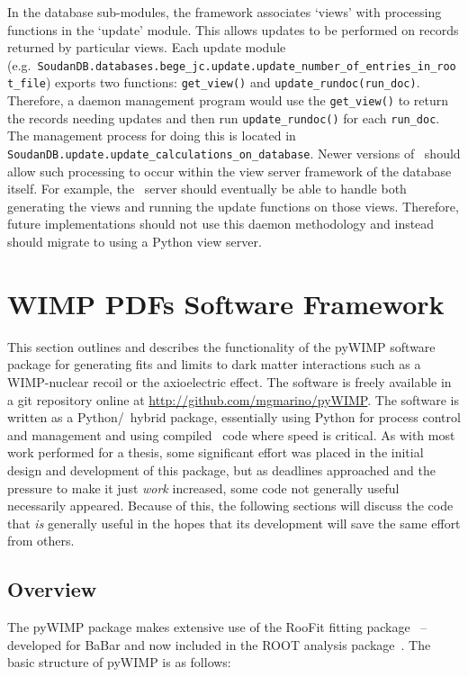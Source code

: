 			\lstset{language=Python}		
	In the database sub-modules, the framework associates `views' with
processing functions in the `update' module.  This allows updates to be
performed on records returned by particular views.  Each update module
(e.g.~\lstinline!SoudanDB.databases.bege_jc.update.update_number_of_entries_in_root_file!)
exports two functions: \lstinline!get_view()! and \lstinline!update_rundoc(run_doc)!.  Therefore,
a daemon management program would use the \lstinline!get_view()! to return the records needing
updates and then run \lstinline!update_rundoc()! for each \lstinline!run_doc!.  The management process
for doing this is located in \lstinline!SoudanDB.update.update_calculations_on_database!.
Newer versions of \couchdb~should allow such processing to occur within the
view server framework of the database itself.  For example, the \couchdb~server should eventually be
able to handle both generating the views and running the update functions on
those views.  Therefore, future implementations should not use this daemon
methodology and instead should migrate to using a Python view server.  

		
	\section{WIMP PDFs Software Framework}
	\label{sec:WIMPPDFs}
	This section outlines and describes the functionality of the pyWIMP software package for generating fits and limits
to dark matter interactions such as a WIMP-nuclear recoil or the axioelectric effect.  The software is freely available in a 
git repository online at \url{http://github.com/mgmarino/pyWIMP}.  The software is written as a Python/\cpp~hybrid package, essentially
using Python for process control and management and using compiled \cpp~code where speed is critical.  As with most work performed for a thesis, some significant effort was placed in the initial design and development of this package, but as deadlines approached and the pressure to make it just \emph{work} increased, some code not generally useful necessarily appeared.  Because of this, the following sections will discuss the code that \emph{is} generally useful in the hopes that its development will save the same effort from others.  
	
		\subsection{Overview}
	The pyWIMP package makes extensive use of the RooFit fitting package~\cite{ver03aa} -- developed for BaBar and now included in the ROOT analysis package~\cite{Bru97}.  The basic structure of pyWIMP is as follows:
	
